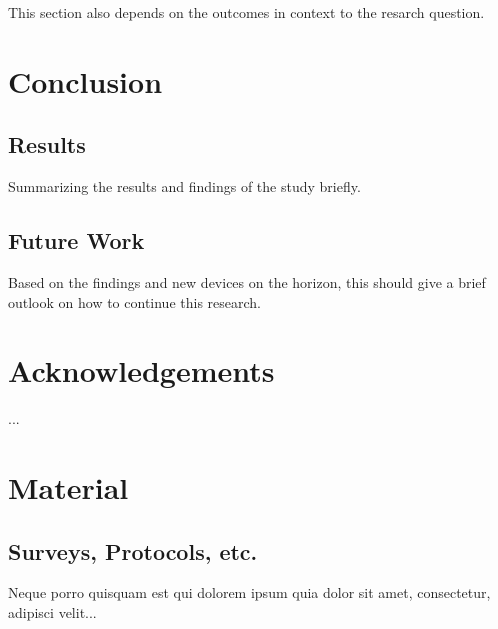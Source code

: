         This section also depends on the outcomes in context to the resarch question.

    \chapter{Conclusion}

        \section{Results}

            Summarizing the results and findings of the study briefly.

        \section{Future Work}


            Based on the findings and new devices on the horizon, this should give a brief outlook on how to continue this research.

    \chapter{Acknowledgements}

        ...

    \appendix

        \chapter{Material}

            \section{Surveys, Protocols, etc.}

                Neque porro quisquam est qui dolorem ipsum quia dolor sit amet, consectetur, adipisci velit...


        \listoffigures %
        \listoftables %


     
    

    \clearpage\thispagestyle{empty}
    \eigen  %

